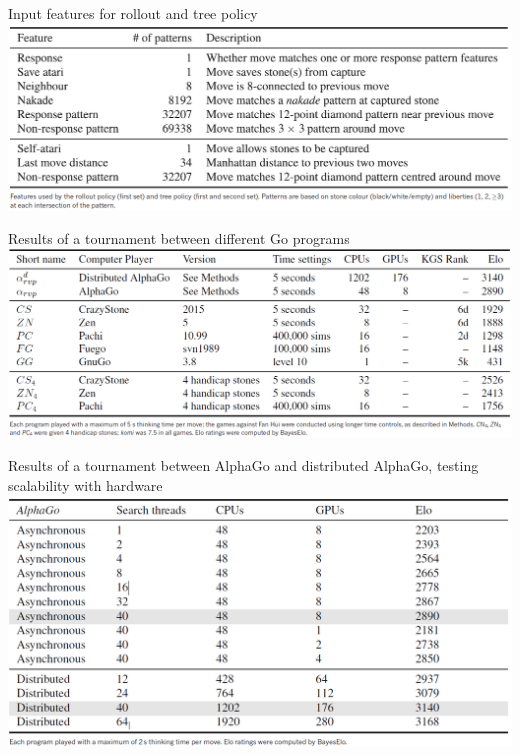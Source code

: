 \documentclass{beamer}
\begin{document}
  {

    \begin{frame}{Input features for rollout and tree policy}
      \includegraphics[width=\textwidth]{../img/input_features_for_AlphaGo.png}
    \end{frame}

    \begin{frame}{Results of a tournament between different Go programs}
      \includegraphics[width=\textwidth]{../img/results_of_the_tournament.png}
    \end{frame}

    \begin{frame}{Results of a tournament between AlphaGo and distributed AlphaGo, testing scalability with hardware}
      \includegraphics[width=\textwidth]{../img/results_of_scalability_tests.png}
    \end{frame}

}
\end{document}
